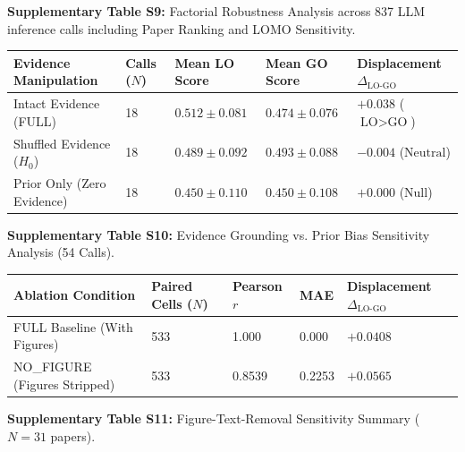 \documentclass[12pt]{article}
\begin{document}
\textbf{Supplementary Table S9:} Factorial Robustness Analysis across 837 LLM inference calls including Paper Ranking and LOMO Sensitivity.

\begin{longtable}[]{@{}lllll@{}}
\toprule
\textbf{Evidence Manipulation} & \textbf{Calls ($N$)} & \textbf{Mean LO Score} & \textbf{Mean GO Score} & \textbf{Displacement $\Delta_{\text{LO-GO}}$} \\
\midrule
\endhead
\bottomrule
\endlastfoot
Intact Evidence (FULL) & 18 & $0.512 \pm 0.081$ & $0.474 \pm 0.076$ & $+0.038$ ($\text{LO} > \text{GO}$) \\
Shuffled Evidence ($H_0$) & 18 & $0.489 \pm 0.092$ & $0.493 \pm 0.088$ & $-0.004$ ($\text{Neutral}$) \\
Prior Only (Zero Evidence) & 18 & $0.450 \pm 0.110$ & $0.450 \pm 0.108$ & $+0.000$ ($\text{Null}$) \\
\end{longtable}

\textbf{Supplementary Table S10:} Evidence Grounding vs. Prior Bias Sensitivity Analysis (54 Calls).

\begin{longtable}[]{@{}lllll@{}}
\toprule
\textbf{Ablation Condition} & \textbf{Paired Cells ($N$)} & \textbf{Pearson $r$} & \textbf{MAE} & \textbf{Displacement $\Delta_{\text{LO-GO}}$} \\
\midrule
\endhead
\bottomrule
\endlastfoot
FULL Baseline (With Figures) & 533 & 1.000 & 0.000 & $+0.0408$ \\
NO\_FIGURE (Figures Stripped) & 533 & 0.8539 & 0.2253 & $+0.0565$ \\
\end{longtable}

\textbf{Supplementary Table S11:} Figure-Text-Removal Sensitivity Summary ($N=31$ papers).
\end{document}

